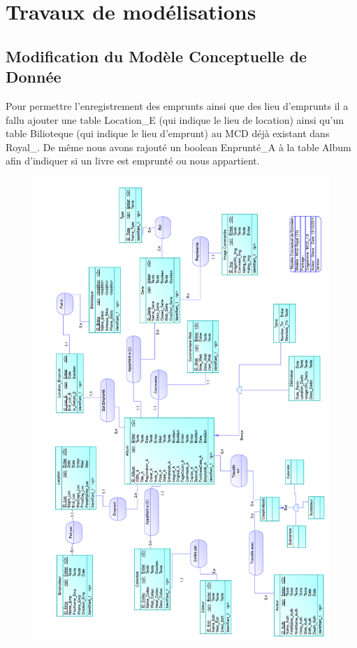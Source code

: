 \section{Travaux de modélisations} 
\subsection{Modification du Modèle Conceptuelle de Donnée}

Pour permettre l'enregistrement des emprunts ainsi que des lieu d'emprunts il a fallu ajouter une table Location\_E (qui indique le lieu de location) ainsi qu'un table Bilioteque (qui indique le lieu d'emprunt) au MCD déjà existant dans Royal\_.
De même nous avons rajouté un boolean Enprunté\_A à la table Album afin d'indiquer si un livre est emprunté ou nous appartient.

\begin{figure}[h!]
\begin{center}
\includegraphics[width=13cm]{MCD_Royal_Modif.png}
\end{center}
\end{figure}
\newpage{} 

